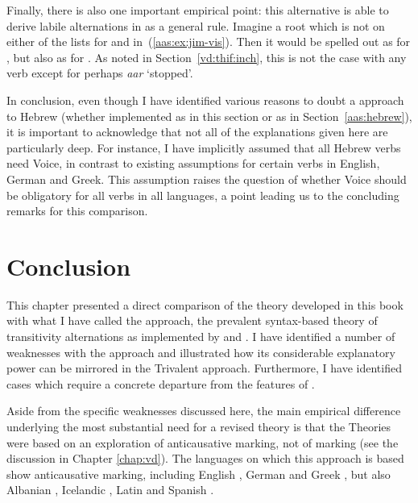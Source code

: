 \begin{exe}
\begin{xlist}
\begin{exe}
\begin{exe}
\begin{xlist}
\begin{exe}
\begin{exe}
\begin{exe}
\begin{exe}
\begin{exe}
\begin{xlist}
\begin{exe}
\begin{exe}
\begin{xlist}
\begin{exe}
\begin{xlist}
\begin{exe}
\begin{xlist}
\begin{exe}
\begin{xlist}
Finally, there is also one important empirical point: this alternative is able to derive labile alternations in {\tkal} as a general rule. Imagine a root  which is not on either of the lists for {\vds} and {\vzs} in~(\ref{aas:ex:jim-vis}). Then it would be spelled out as {\tkal} for {\vds}, but also as {\tkal} for {\vzs}. As noted in Section~\ref{vd:thif:inch}, this is not the case with any verb except for perhaps \emph{a{\ts}ar} `stopped'.

In conclusion, even though I have identified various reasons to doubt a  approach to Hebrew (whether implemented as in this section or as in Section~\ref{aas:hebrew}), it is important to acknowledge that not all of the explanations given here are particularly deep. For instance, I have implicitly assumed that all Hebrew verbs need Voice, in contrast to existing assumptions for certain verbs in English, German and Greek. This assumption raises the question of whether Voice should be obligatory for all verbs in all languages, a point leading us to the concluding remarks for this comparison.


\section{Conclusion} \label{aas:conc}
This chapter presented a direct comparison of the theory developed in this book with what I have called the  approach, the prevalent syntax-based theory of transitivity alternations as implemented by \cite{schaefer08,schaefer17oup} and \cite{layering15}. I have identified a number of weaknesses with the  approach and illustrated how its considerable explanatory power can be mirrored in the Trivalent approach. Furthermore, I have identified cases which require a concrete departure from the features of .

Aside from the specific weaknesses discussed here, the main empirical difference underlying the most substantial need for a revised theory is that the  Theories were based on an exploration of anticausative marking, not of  marking (see the discussion in Chapter \ref{chap:vd}). The languages on which this approach is based show anticausative marking, including English \citep{myler16mit}, German \citep{schaefer17oup} and Greek \citep{spathasetal15}, but also Albanian \citep{kallulli13}, Icelandic \citep{wood15springer}, Latin \citep{embick04,kastnerzu17} and Spanish \citep{schaefervivanco16}.


\end{xlist}
\end{exe}
\end{xlist}
\end{exe}
\end{xlist}
\end{exe}
\end{xlist}
\end{exe}
\end{exe}
\end{xlist}
\end{exe}
\end{exe}
\end{exe}
\end{exe}
\end{exe}
\end{xlist}
\end{exe}
\end{exe}
\end{xlist}
\end{exe}
